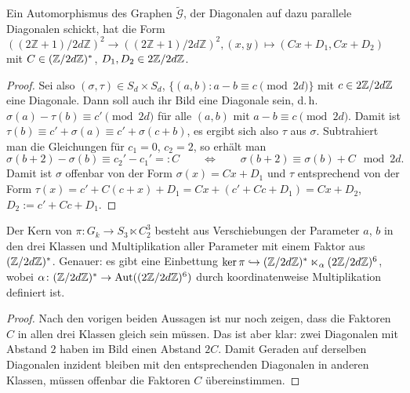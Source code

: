\begin{lemma}
Ein Automorphismus des Graphen $\tilde{\mathcal G}$, der Diagonalen auf dazu parallele Diagonalen schickt, hat die Form $((2\mathbb Z+1)/2d\mathbb Z)^2 \to ((2\mathbb Z+1)/2d\mathbb Z)^2, (x,y) \mapsto (Cx+D_1, Cx+D_2)$ mit $C \in (\Zmod 2dZ)^*$, $D_1, D_2 \in 2\Zmod 2dZ$.
\end{lemma}
\begin{proof}
Sei also $(\sigma, \tau) \in S_d \times S_d$, $\{(a,b) : a-b \equiv c \pmod{2d}\}$ mit $c \in 2\Zmod 2dZ$ eine Diagonale. Dann soll auch ihr Bild eine Diagonale sein, d.\,h. $\sigma(a) - \tau(b) \equiv c' \pmod{2d}$ für alle $(a,b)$ mit $a-b \equiv c \pmod{2d}$. Damit ist $\tau(b) \equiv c' + \sigma(a) \equiv c' + \sigma(c+b)$, es ergibt sich also $\tau$ aus $\sigma$. Subtrahiert man die Gleichungen für $c_1=0$, $c_2=2$, so erhält man
\begin{equation*}
\sigma(b+2) - \sigma(b) \equiv c_2' - c_1' =: C \qquad\Longleftrightarrow\qquad \sigma(b+2) \equiv \sigma(b) + C  \mod{2d}.
\end{equation*}
Damit ist $\sigma$ offenbar von der Form $\sigma(x) = Cx+D_1$ und $\tau$ entsprechend von der Form $\tau(x) = c' + C(c+x) + D_1 = Cx + (c'+Cc+D_1) = Cx + D_2$, $D_2 := c'+Cc+D_1$.
\end{proof}

\begin{lemma}
Der Kern von $\pi \colon G_k \to S_3 \ltimes C_2^3$ besteht aus Verschiebungen der Parameter $a$, $b$ in den drei Klassen und Multiplikation aller Parameter mit einem Faktor aus $(\Zmod 2dZ)^*$. Genauer: es gibt eine Einbettung $\ker \pi \into (\Zmod 2dZ)^* \ltimes_\alpha (2\Zmod 2dZ)^6$, wobei $\alpha \colon (\Zmod 2dZ)^* \to \Aut((2\Zmod 2dZ)^6)$ durch koordinatenweise Multiplikation definiert ist.
\end{lemma}
\begin{proof}
Nach den vorigen beiden Aussagen ist nur noch zeigen, dass die Faktoren $C$ in allen drei Klassen gleich sein müssen. Das ist aber klar: zwei Diagonalen mit Abstand $2$ haben im Bild einen Abstand $2C$. Damit Geraden auf derselben Diagonalen inzident bleiben mit den entsprechenden Diagonalen in anderen Klassen, müssen offenbar die Faktoren $C$ übereinstimmen.
\end{proof}

